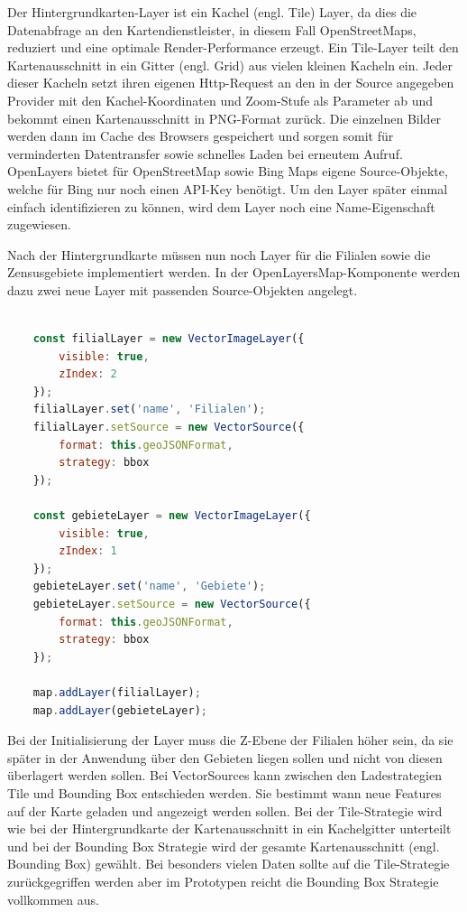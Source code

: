Der Hintergrundkarten-Layer ist ein Kachel (engl. Tile) Layer, da dies die Datenabfrage an den Kartendienstleister, in diesem Fall OpenStreetMaps, reduziert und eine optimale Render-Performance erzeugt.
Ein Tile-Layer teilt den Kartenausschnitt in ein Gitter (engl. Grid) aus vielen kleinen Kacheln ein.
Jeder dieser Kacheln setzt ihren eigenen Http-Request an den in der Source angegeben Provider mit den Kachel-Koordinaten und Zoom-Stufe als Parameter ab und bekommt einen Kartenausschnitt in PNG-Format zurück.
Die einzelnen Bilder werden dann im Cache des Browsers gespeichert und sorgen somit für verminderten Datentransfer sowie schnelles Laden bei erneutem Aufruf.
OpenLayers bietet für OpenStreetMap sowie Bing Maps eigene Source-Objekte, welche für Bing nur noch einen API-Key benötigt.
Um den Layer später einmal einfach identifizieren zu können, wird dem Layer noch eine Name-Eigenschaft zugewiesen.

Nach der Hintergrundkarte müssen nun noch Layer für die Filialen sowie die Zensusgebiete implementiert werden.
In der OpenLayersMap-Komponente werden dazu zwei neue Layer mit passenden Source-Objekten angelegt.

\begin{lstlisting}[language=JavaScript, caption={Erstellung der Filial- und Gebietelayer}]

	const filialLayer = new VectorImageLayer({
		visible: true,
		zIndex: 2
	});	
	filialLayer.set('name', 'Filialen');
	filialLayer.setSource = new VectorSource({
		format: this.geoJSONFormat,
		strategy: bbox	
	});

	const gebieteLayer = new VectorImageLayer({
		visible: true,
		zIndex: 1
	});
	gebieteLayer.set('name', 'Gebiete');
	gebieteLayer.setSource = new VectorSource({
		format: this.geoJSONFormat,
		strategy: bbox	
	});

	map.addLayer(filialLayer);
	map.addLayer(gebieteLayer);
\end{lstlisting}

Bei der Initialisierung der Layer muss die Z-Ebene der Filialen höher sein, da sie später in der Anwendung über den Gebieten liegen sollen und nicht von diesen überlagert werden sollen.
Bei VectorSources kann zwischen den Ladestrategien Tile und Bounding Box entschieden werden.
Sie bestimmt wann neue Features auf der Karte geladen und angezeigt werden sollen.
Bei der Tile-Strategie wird wie bei der Hintergrundkarte der Kartenausschnitt in ein Kachelgitter unterteilt und bei der Bounding Box Strategie wird der gesamte Kartenausschnitt (engl. Bounding Box) gewählt. 
Bei besonders vielen Daten sollte auf die Tile-Strategie zurückgegriffen werden aber im Prototypen reicht die Bounding Box Strategie vollkommen aus.

